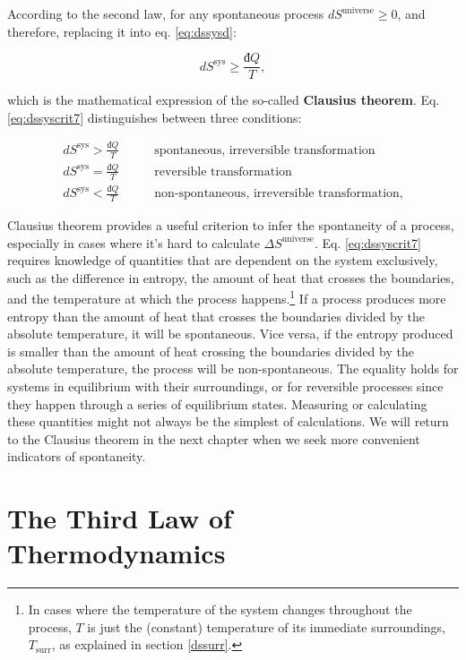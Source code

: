 \documentclass[
  9pt,
]{extbook}
\theoremstyle{definition}
\theoremstyle{definition}
\theoremstyle{definition}
\theoremstyle{remark}
\begin{document}
According to the second law, for any spontaneous process \(d S^{\mathrm{universe}}\geq0\), and therefore, replacing it into eq. \eqref{eq:dssysd}:

\begin{equation}
d S^{\mathrm{sys}} \geq \frac{đQ}{T},
\label{eq:dssyscrit7}
\end{equation}

which is the mathematical expression of the so-called \textbf{Clausius theorem}. Eq. \eqref{eq:dssyscrit7} distinguishes between three conditions:

\begin{equation}
\begin{aligned}
d S^{\mathrm{sys}} > \frac{đQ}{T} \qquad &\text{spontaneous, irreversible transformation} \\
d S^{\mathrm{sys}} = \frac{đQ}{T} \qquad &\text{reversible transformation} \\
d S^{\mathrm{sys}} < \frac{đQ}{T} \qquad &\text{non-spontaneous, irreversible transformation}, 
\end{aligned}
\label{eq:dssyscond}
\end{equation}

Clausius theorem provides a useful criterion to infer the spontaneity of a process, especially in cases where it's hard to calculate \(\Delta S^{\mathrm{universe}}\). Eq. \eqref{eq:dssyscrit7} requires knowledge of quantities that are dependent on the system exclusively, such as the difference in entropy, the amount of heat that crosses the boundaries, and the temperature at which the process happens.\footnote{In cases where the temperature of the system changes throughout the process, \(T\) is just the (constant) temperature of its immediate surroundings, \(T_{\text{surr}}\), as explained in section \ref{dssurr}.} If a process produces more entropy than the amount of heat that crosses the boundaries divided by the absolute temperature, it will be spontaneous. Vice versa, if the entropy produced is smaller than the amount of heat crossing the boundaries divided by the absolute temperature, the process will be non-spontaneous. The equality holds for systems in equilibrium with their surroundings, or for reversible processes since they happen through a series of equilibrium states. Measuring or calculating these quantities might not always be the simplest of calculations. We will return to the Clausius theorem in the next chapter when we seek more convenient indicators of spontaneity.

\hypertarget{thirdlawsect}{%
\section{The Third Law of Thermodynamics}\label{thirdlawsect}}
\end{document}
